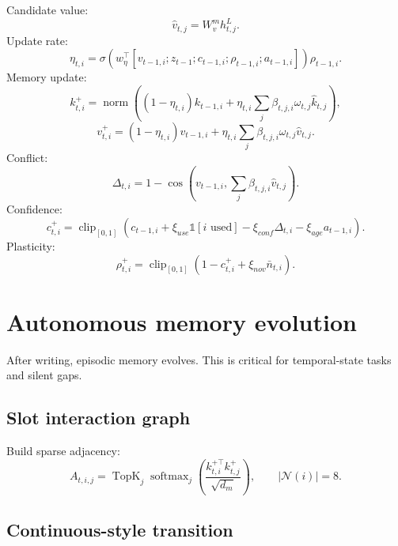 \documentclass[11pt]{article}
\newcommand{\softmax}{\operatorname{softmax}}
\newcommand{\cosine}{\operatorname{cos}}
\newcommand{\TopK}{\operatorname{TopK}}
\begin{document}
Candidate value:
\begin{equation}
    \hat{v}_{t,j}=W_v^m h_{t,j}^L.
\end{equation}
Update rate:
\begin{equation}
    \eta_{t,i}=\sigma\left(w_\eta^\top[v_{t-1,i};z_{t-1};c_{t-1,i};\rho_{t-1,i};a_{t-1,i}]\right)\rho_{t-1,i}.
\end{equation}
Memory update:
\begin{equation}
    k_{t,i}^{+}=\operatorname{norm}\left((1-\eta_{t,i})k_{t-1,i}+\eta_{t,i}\sum_j\beta_{t,j,i}\omega_{t,j}\hat{k}_{t,j}\right),
\end{equation}
\begin{equation}
    v_{t,i}^{+}=(1-\eta_{t,i})v_{t-1,i}+\eta_{t,i}\sum_j\beta_{t,j,i}\omega_{t,j}\hat{v}_{t,j}.
\end{equation}
Conflict:
\begin{equation}
    \Delta_{t,i}=1-\cosine\left(v_{t-1,i},\sum_j\beta_{t,j,i}\hat{v}_{t,j}\right).
\end{equation}
Confidence:
\begin{equation}
    c_{t,i}^{+}=\operatorname{clip}_{[0,1]}\left(c_{t-1,i}+\xi_{use}\mathbb{1}[i\text{ used}]-\xi_{conf}\Delta_{t,i}-\xi_{age}a_{t-1,i}\right).
\end{equation}
Plasticity:
\begin{equation}
    \rho_{t,i}^{+}=\operatorname{clip}_{[0,1]}\left(1-c_{t,i}^{+}+\xi_{nov}\bar{n}_{t,i}\right).
\end{equation}

\section{Autonomous memory evolution}

After writing, episodic memory evolves. This is critical for temporal-state tasks and silent gaps.

\subsection{Slot interaction graph}

Build sparse adjacency:
\begin{equation}
    A_{t,i,j}=\TopK_j\softmax_j\left(\frac{k_{t,i}^{+\top}k_{t,j}^{+}}{\sqrt{d_m}}\right), \qquad |\mathcal{N}(i)|=8.
\end{equation}

\subsection{Continuous-style transition}
\end{document}
